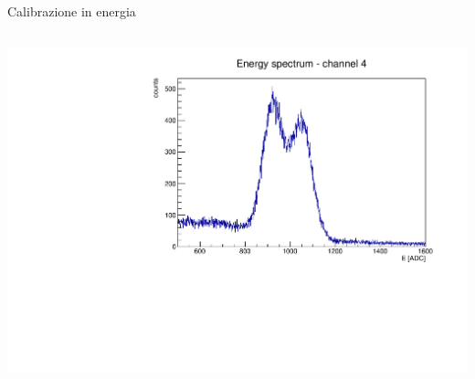 \documentclass [xcolor=svgnames] {beamer}
\begin{document}
\begin{frame}{Calibrazione in energia}
\begin{columns}
{			\includegraphics[width=\linewidth]{img/ex1777.pdf}}
	\end{columns}
\end{frame}





%		
%		
\end{document}
